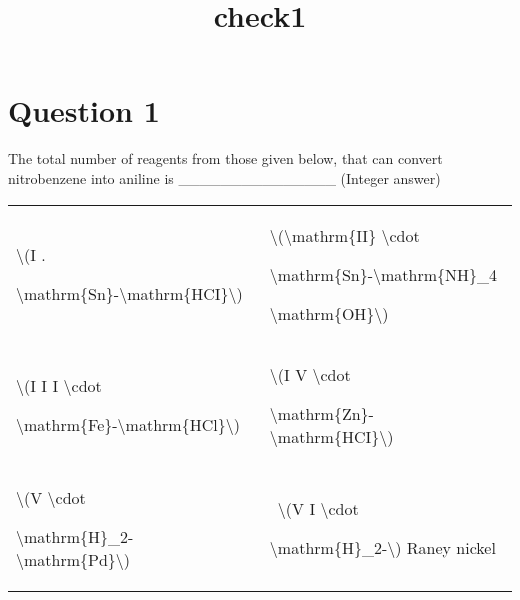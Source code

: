 \documentclass{article}
\title{check1}
\begin{document}
                    \maketitle
                    \section*{Question 1}
The total number of reagents from those given below, that can convert nitrobenzene into aniline is _______________ (Integer answer)\begin{longtable}[]{@{}ll@{}}

\toprule\noalign{}

\endhead

\bottomrule\noalign{}

\endlastfoot

\textbackslash(I .

\textbackslash mathrm\{Sn\}-\textbackslash mathrm\{HCI\}\textbackslash)~

& \textbackslash(\textbackslash mathrm\{II\} \textbackslash cdot

\textbackslash mathrm\{Sn\}-\textbackslash mathrm\{NH\}\_4

\textbackslash mathrm\{OH\}\textbackslash)~ \\

\textbackslash(I I I \textbackslash cdot

\textbackslash mathrm\{Fe\}-\textbackslash mathrm\{HCl\}\textbackslash)~

& \textbackslash(I V \textbackslash cdot

\textbackslash mathrm\{Zn\}-\textbackslash mathrm\{HCI\}\textbackslash)~ \\

\textbackslash(V \textbackslash cdot

\textbackslash mathrm\{H\}\_2-\textbackslash mathrm\{Pd\}\textbackslash)~

& ~\textbackslash(V I \textbackslash cdot

\textbackslash mathrm\{H\}\_2-\textbackslash) Raney nickel \\

\end{longtable}


\begin{enumerate}[label=(\alph*)]
\end{enumerate}
\newpage
\end{document}
